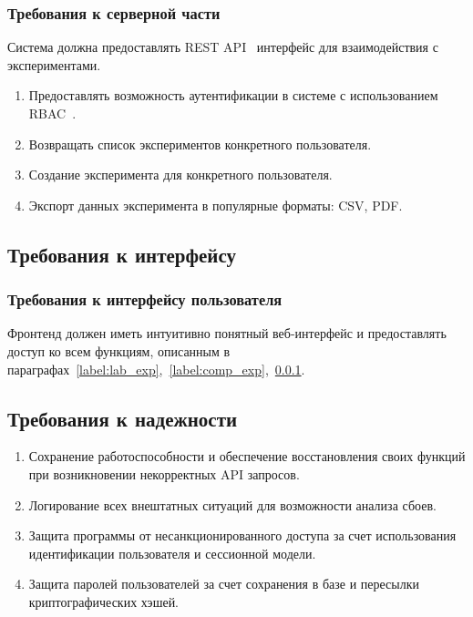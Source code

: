 \documentclass[a4paper,12pt,reqno]{article}
\begin{document}
    \subsubsection{Требования к серверной части} \label{"lable:backend"}
    Система должна предоставлять REST API~\cite{technologies:REST} интерфейс для взаимодействия с экспериментами.
    \begin{enumerate}
        \item Предоставлять возможность аутентификации в системе с использованием RBAC~\cite{arch:RBAC}.
        \item Возвращать список экспериментов конкретного пользователя.
        \item Создание эксперимента для конкретного пользователя.
        \item Экспорт данных эксперимента в популярные форматы: CSV\cite{Format:CSV}, PDF.
    \end{enumerate}

    \subsection{Требования к интерфейсу}

    \subsubsection{Требования к интерфейсу пользователя}
    Фронтенд должен иметь интуитивно понятный веб-интерфейс и предоставлять доступ ко всем функциям, описанным в параграфах~\ref{label:lab_exp},~\ref{label:comp_exp},~\ref{"lable:backend"}.

    \subsection{Требования к надежности}
    \begin{enumerate}
        \item Сохранение работоспособности и обеспечение восстановления своих функций при возникновении некорректных API запросов.
        \item Логирование всех внештатных ситуаций для возможности анализа сбоев.
        \item Защита программы от несанкционированного доступа за счет использования идентификации пользователя и сессионной модели.
        \item Защита паролей пользователей за счет сохранения в базе и пересылки криптографических хэшей.
    \end{enumerate}
\end{document}
